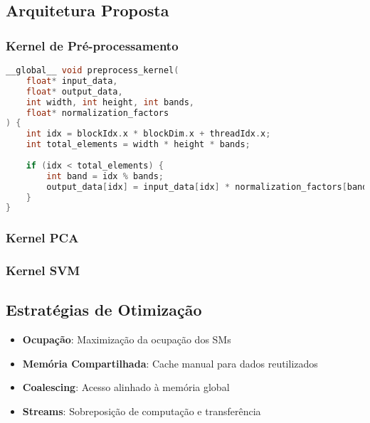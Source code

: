 \subsection{Arquitetura Proposta}

\subsubsection{Kernel de Pré-processamento}
\begin{lstlisting}[language=C++, caption=Kernel de pré-processamento GPU]
__global__ void preprocess_kernel(
    float* input_data,
    float* output_data,
    int width, int height, int bands,
    float* normalization_factors
) {
    int idx = blockIdx.x * blockDim.x + threadIdx.x;
    int total_elements = width * height * bands;
    
    if (idx < total_elements) {
        int band = idx % bands;
        output_data[idx] = input_data[idx] * normalization_factors[band];
    }
}
\end{lstlisting}

\subsubsection{Kernel PCA}

\subsubsection{Kernel SVM}

\subsection{Estratégias de Otimização}
\begin{itemize}
    \item \textbf{Ocupação}: Maximização da ocupação dos SMs
    \item \textbf{Memória Compartilhada}: Cache manual para dados reutilizados
    \item \textbf{Coalescing}: Acesso alinhado à memória global
    \item \textbf{Streams}: Sobreposição de computação e transferência
\end{itemize}

